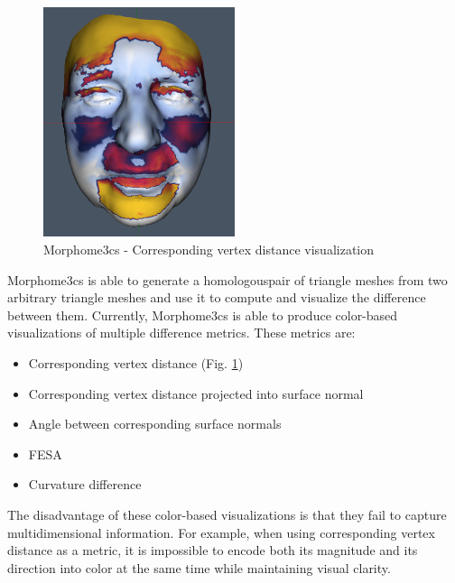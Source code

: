 \begin{figure}[h]
	\centering
	\includegraphics[width=0.5\textwidth]{./img/morpho-example01.PNG}
	\caption[Morphome3cs - Corresponding vertex distance visualization]{Morphome3cs - Corresponding vertex distance visualization}
	\label{fig:morpho-example}
\end{figure}

Morphome3cs is able to generate a homologous\footnotemark pair of triangle meshes from two arbitrary triangle meshes and use it to compute and visualize the difference between them. Currently, Morphome3cs is able to produce color-based visualizations of multiple difference metrics. These metrics are:


\begin{itemize}
\item Corresponding vertex distance (Fig. \ref{fig:morpho-example})
\item Corresponding vertex distance projected into surface normal
\item Angle between corresponding surface normals
\item FESA\footnotemark
\item Curvature difference
\end{itemize}


The disadvantage of these color-based visualizations is that they fail to capture multidimensional information. For example, when using corresponding vertex distance as a metric, it is impossible to encode both its magnitude and its direction into color at the same time while maintaining visual clarity.

